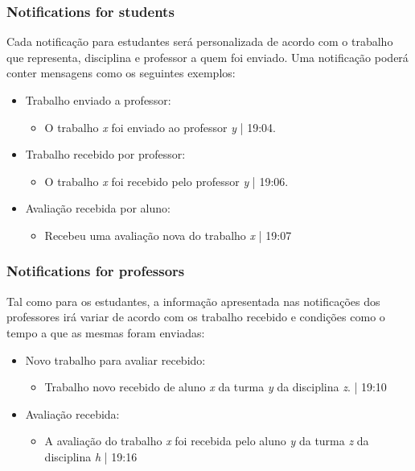 \documentclass[10pt]{article}
\begin{document}
\subsubsection{Notifications for students}
Cada notificação para estudantes será personalizada de acordo com o trabalho
que representa, disciplina e professor a quem foi enviado.
Uma notificação poderá conter mensagens como os seguintes exemplos:

\begin{itemize}
    \item Trabalho enviado a professor:
        \begin{itemize}
            \item O trabalho \textit{x} foi enviado ao professor \textit{y} | 19:04.
        \end{itemize}
    \item Trabalho recebido por professor:
        \begin{itemize}
            \item O trabalho \textit{x} foi recebido pelo professor \textit{y} | 19:06.
        \end{itemize}
    \item Avaliação recebida por aluno:
        \begin{itemize}
            \item Recebeu uma avaliação nova do trabalho \textit{x} | 19:07
        \end{itemize}
\end{itemize}

\subsubsection{Notifications for professors}
Tal como para os estudantes, a informação apresentada nas notificações
dos professores irá variar de acordo com os trabalho recebido e condições
como o tempo a que as mesmas foram enviadas:
\begin{itemize}
    \item Novo trabalho para avaliar recebido:
        \begin{itemize}
            \item Trabalho novo recebido de aluno \textit{x} da turma \textit{y} da disciplina \textit{z}. | 19:10
        \end{itemize}
    \item Avaliação recebida:
        \begin{itemize}
            \item A avaliação do trabalho \textit{x} foi recebida pelo aluno \textit{y} da turma \textit{z}
                da disciplina \textit{h} | 19:16
        \end{itemize}
\end{itemize}
\end{document}
